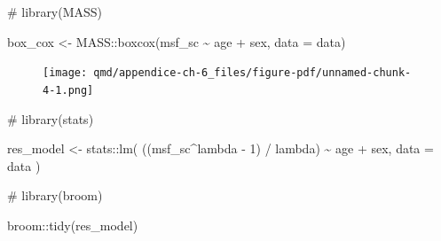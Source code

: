 \documentclass[
  12pt,
  a4paper,
  oneside]{tesesusp}
\newenvironment{Shaded}{\begin{snugshade}}{\end{snugshade}}
\newcommand{\AttributeTok}[1]{\textcolor[rgb]{0.40,0.45,0.13}{#1}}
\newcommand{\CommentTok}[1]{\textcolor[rgb]{0.37,0.37,0.37}{#1}}
\newcommand{\DecValTok}[1]{\textcolor[rgb]{0.68,0.00,0.00}{#1}}
\newcommand{\FunctionTok}[1]{\textcolor[rgb]{0.28,0.35,0.67}{#1}}
\newcommand{\NormalTok}[1]{\textcolor[rgb]{0.00,0.23,0.31}{#1}}
\newcommand{\OtherTok}[1]{\textcolor[rgb]{0.00,0.23,0.31}{#1}}
\newcommand{\SpecialCharTok}[1]{\textcolor[rgb]{0.37,0.37,0.37}{#1}}
\begin{document}
\begin{Shaded}
\begin{Highlighting}[numbers=left,,]
\CommentTok{\# library(MASS)}

\NormalTok{box\_cox }\OtherTok{\textless{}{-}}\NormalTok{ MASS}\SpecialCharTok{::}\FunctionTok{boxcox}\NormalTok{(msf\_sc }\SpecialCharTok{\textasciitilde{}}\NormalTok{ age }\SpecialCharTok{+}\NormalTok{ sex, }\AttributeTok{data =}\NormalTok{ data)}
\end{Highlighting}
\end{Shaded}

\begin{figure}[H]

{\centering \texttt{[image: qmd/appendice-ch-6\_files/figure-pdf/unnamed-chunk-4-1.png]}

}

\end{figure}

\begin{Shaded}
\end{Shaded}

\begin{Shaded}
\begin{Highlighting}[numbers=left,,]
\CommentTok{\# library(stats)}

\NormalTok{res\_model }\OtherTok{\textless{}{-}}\NormalTok{ stats}\SpecialCharTok{::}\FunctionTok{lm}\NormalTok{(}
\NormalTok{  ((msf\_sc}\SpecialCharTok{\^{}}\NormalTok{lambda }\SpecialCharTok{{-}} \DecValTok{1}\NormalTok{) }\SpecialCharTok{/}\NormalTok{ lambda) }\SpecialCharTok{\textasciitilde{}}\NormalTok{ age }\SpecialCharTok{+}\NormalTok{ sex, }\AttributeTok{data =}\NormalTok{ data}
\NormalTok{  )}
\end{Highlighting}
\end{Shaded}

\begin{Shaded}
\begin{Highlighting}[numbers=left,,]
\CommentTok{\# library(broom)}

\NormalTok{broom}\SpecialCharTok{::}\FunctionTok{tidy}\NormalTok{(res\_model)}
\end{Highlighting}
\end{Shaded}
\end{document}
